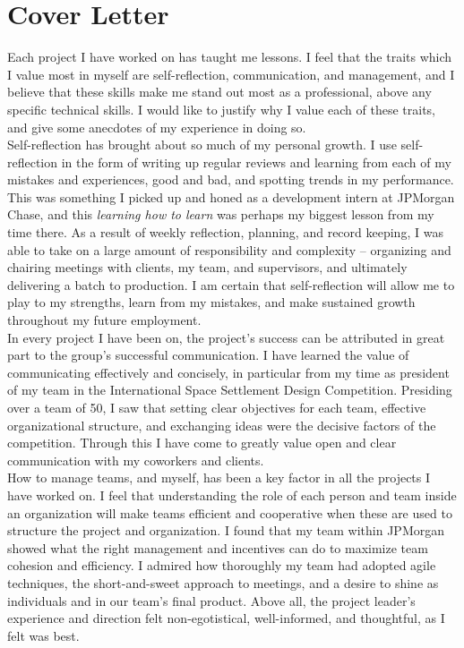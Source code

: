 \documentclass{article}
\begin{document}
\section{Cover Letter}

Each project I have worked on has taught me lessons. I feel that the traits
which I value most in myself are self-reflection, communication, and
management, and I believe that these skills make me stand out most as a
professional, above any specific technical skills. I would like to justify why
I value each of these traits, and give some anecdotes of my experience in doing
so.\\

Self-reflection has brought about so much of my personal growth.
I use self-reflection in the form of writing up regular reviews and learning
from each of my mistakes and experiences, good and bad, and spotting trends in
my performance. This was something I picked up and honed as a development
intern at JPMorgan Chase, and this \textit{learning how to learn} was perhaps
my biggest lesson from my time there. As a result of weekly reflection,
planning, and record keeping, I was able to take on a large amount of
responsibility and complexity -- organizing and chairing meetings with clients,
my team, and supervisors, and ultimately delivering a batch to production.
I am certain that self-reflection will allow me to play to my strengths, learn
from my mistakes, and make sustained growth throughout my future employment.\\

In every project I have been on, the project's success can be attributed in
great part to the group's successful communication. I have learned the value of
communicating effectively and concisely, in particular from my time as
president of my team in the International Space Settlement Design Competition.
Presiding over a team of 50, I saw that setting clear objectives for each team,
effective organizational structure, and exchanging ideas were the decisive
factors of the competition. Through this I have come to greatly value open and
clear communication with my coworkers and clients.\\

How to manage teams, and myself, has been a key factor in all the projects I
have worked on. I feel that understanding the role of each person and team
inside an organization will make teams efficient and cooperative when these are
used to structure the project and organization. I found that my team within
JPMorgan showed what the right management and incentives can do to maximize
team cohesion and efficiency.  I admired how thoroughly my team had adopted
agile techniques, the short-and-sweet approach to meetings, and a desire to
shine as individuals and in our team's final product. Above all, the project
leader's experience and direction felt non-egotistical, well-informed, and
thoughtful, as I felt was best.\\
\end{document}
